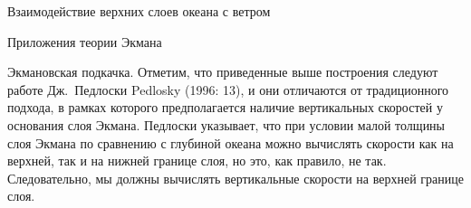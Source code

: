 \begin{chapter}{Взаимодействие верхних слоев океана с ветром}
\begin{section}{Приложения теории Экмана}
\begin{paragraph}{Экмановская подкачка.}
Отметим, что приведенные выше построения следуют работе 
Дж.~Педлоски Pedlosky (1996: 13), и они отличаются от традиционного подхода,
в рамках которого предполагается наличие вертикальных скоростей у основания
слоя Экмана. Педлоски указывает, что при условии малой толщины слоя Экмана 
по сравнению с глубиной океана можно вычислять скорости как на верхней, 
так и на нижней границе слоя, но это, как правило, не так. Следовательно, 
мы должны вычислять вертикальные скорости на верхней границе 
слоя.
%


\end{paragraph}
\end{section}
\end{chapter}
